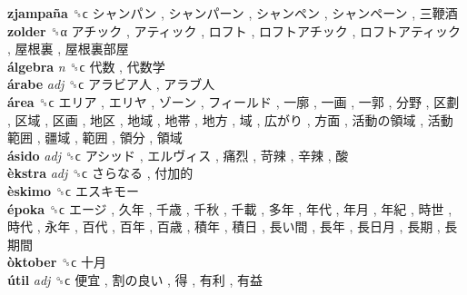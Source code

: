 \textbf{zjampaña} ␝ϲ   シャンパン ,  シャンパーン ,  シャンペン ,  シャンペーン ,  三鞭酒   \\
\textbf{zolder} ␝α   アチック ,  アティック ,  ロフト ,  ロフトアチック ,  ロフトアティック ,  屋根裏 ,  屋根裏部屋   \\
\textbf{álgebra} \emph{n}  ␝ϲ   代数 ,  代数学   \\
\textbf{árabe} \emph{adj}  ␝ϲ   アラビア人 ,  アラブ人   \\
\textbf{área} ␝ϲ   エリア ,  エリヤ ,  ゾーン ,  フィールド ,  一廓 ,  一画 ,  一郭 ,  分野 ,  区劃 ,  区域 ,  区画 ,  地区 ,  地域 ,  地帯 ,  地方 ,  域 ,  広がり ,  方面 ,  活動の領域 ,  活動範囲 ,  疆域 ,  範囲 ,  領分 ,  領域   \\
\textbf{ásido} \emph{adj}  ␝ϲ   アシッド ,  エルヴィス ,  痛烈 ,  苛辣 ,  辛辣 ,  酸   \\
\textbf{èkstra} \emph{adj}  ␝ϲ   さらなる ,  付加的   \\
\textbf{èskimo} ␝ϲ   エスキモー   \\
\textbf{époka} ␝ϲ   エージ ,  久年 ,  千歳 ,  千秋 ,  千載 ,  多年 ,  年代 ,  年月 ,  年紀 ,  時世 ,  時代 ,  永年 ,  百代 ,  百年 ,  百歳 ,  積年 ,  積日 ,  長い間 ,  長年 ,  長日月 ,  長期 ,  長期間   \\
\textbf{òktober} ␝ϲ   十月   \\
\textbf{útil} \emph{adj}  ␝ϲ   便宜 ,  割の良い ,  得 ,  有利 ,  有益   \\

